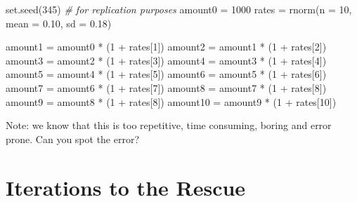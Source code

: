 \documentclass[
]{book}
\newenvironment{Shaded}{\begin{snugshade}}{\end{snugshade}}
\newcommand{\AttributeTok}[1]{\textcolor[rgb]{0.77,0.63,0.00}{#1}}
\newcommand{\CommentTok}[1]{\textcolor[rgb]{0.56,0.35,0.01}{\textit{#1}}}
\newcommand{\DecValTok}[1]{\textcolor[rgb]{0.00,0.00,0.81}{#1}}
\newcommand{\FloatTok}[1]{\textcolor[rgb]{0.00,0.00,0.81}{#1}}
\newcommand{\FunctionTok}[1]{\textcolor[rgb]{0.00,0.00,0.00}{#1}}
\newcommand{\NormalTok}[1]{#1}
\newcommand{\OtherTok}[1]{\textcolor[rgb]{0.56,0.35,0.01}{#1}}
\newcommand{\SpecialCharTok}[1]{\textcolor[rgb]{0.00,0.00,0.00}{#1}}
\begin{document}
\begin{Shaded}
\begin{Highlighting}[]
\FunctionTok{set.seed}\NormalTok{(}\DecValTok{345}\NormalTok{)   }\CommentTok{\# for replication purposes}
\NormalTok{amount0 }\OtherTok{=} \DecValTok{1000}
\NormalTok{rates }\OtherTok{=} \FunctionTok{rnorm}\NormalTok{(}\AttributeTok{n =} \DecValTok{10}\NormalTok{, }\AttributeTok{mean =} \FloatTok{0.10}\NormalTok{, }\AttributeTok{sd =} \FloatTok{0.18}\NormalTok{)}

\NormalTok{amount1 }\OtherTok{=}\NormalTok{ amount0 }\SpecialCharTok{*}\NormalTok{ (}\DecValTok{1} \SpecialCharTok{+}\NormalTok{ rates[}\DecValTok{1}\NormalTok{])}
\NormalTok{amount2 }\OtherTok{=}\NormalTok{ amount1 }\SpecialCharTok{*}\NormalTok{ (}\DecValTok{1} \SpecialCharTok{+}\NormalTok{ rates[}\DecValTok{2}\NormalTok{])}
\NormalTok{amount3 }\OtherTok{=}\NormalTok{ amount2 }\SpecialCharTok{*}\NormalTok{ (}\DecValTok{1} \SpecialCharTok{+}\NormalTok{ rates[}\DecValTok{3}\NormalTok{])}
\NormalTok{amount4 }\OtherTok{=}\NormalTok{ amount3 }\SpecialCharTok{*}\NormalTok{ (}\DecValTok{1} \SpecialCharTok{+}\NormalTok{ rates[}\DecValTok{4}\NormalTok{])}
\NormalTok{amount5 }\OtherTok{=}\NormalTok{ amount4 }\SpecialCharTok{*}\NormalTok{ (}\DecValTok{1} \SpecialCharTok{+}\NormalTok{ rates[}\DecValTok{5}\NormalTok{])}
\NormalTok{amount6 }\OtherTok{=}\NormalTok{ amount5 }\SpecialCharTok{*}\NormalTok{ (}\DecValTok{1} \SpecialCharTok{+}\NormalTok{ rates[}\DecValTok{6}\NormalTok{])}
\NormalTok{amount7 }\OtherTok{=}\NormalTok{ amount6 }\SpecialCharTok{*}\NormalTok{ (}\DecValTok{1} \SpecialCharTok{+}\NormalTok{ rates[}\DecValTok{7}\NormalTok{])}
\NormalTok{amount8 }\OtherTok{=}\NormalTok{ amount7 }\SpecialCharTok{*}\NormalTok{ (}\DecValTok{1} \SpecialCharTok{+}\NormalTok{ rates[}\DecValTok{8}\NormalTok{])}
\NormalTok{amount9 }\OtherTok{=}\NormalTok{ amount8 }\SpecialCharTok{*}\NormalTok{ (}\DecValTok{1} \SpecialCharTok{+}\NormalTok{ rates[}\DecValTok{8}\NormalTok{])}
\NormalTok{amount10 }\OtherTok{=}\NormalTok{ amount9 }\SpecialCharTok{*}\NormalTok{ (}\DecValTok{1} \SpecialCharTok{+}\NormalTok{ rates[}\DecValTok{10}\NormalTok{])}
\end{Highlighting}
\end{Shaded}

Note: we know that this is too repetitive, time consuming, boring and
error prone. Can you spot the error?

\hypertarget{iterations-to-the-rescue}{%
\section{Iterations to the Rescue}\label{iterations-to-the-rescue}}
\end{document}
